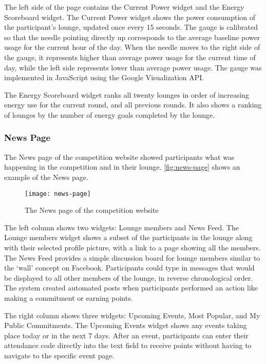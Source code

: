 The left side of the page contains the Current Power widget and the Energy Scoreboard widget. The Current Power widget shows the power consumption of the participant's lounge, updated once every 15 seconds. The gauge is calibrated so that the needle pointing directly up corresponds to the average baseline power usage for the current hour of the day. When the needle moves to the right side of the gauge, it represents higher than average power usage for the current time of day, while the left side represents lower than average power usage. The gauge was implemented in JavaScript using the Google Visualization API.\@

The Energy Scoreboard widget ranks all twenty lounges in order of increasing energy use for the current round, and all previous rounds. It also shows a ranking of lounges by the number of energy goals completed by the lounge.


\subsubsection{News Page}
\label{sec:news-page}

The News page of the competition website showed participants what was happening in the competition and in their lounge. \autoref{fig:news-page} shows an example of the News page.

\begin{figure}[htbp]
	\centering
		\texttt{[image: news-page]}
		\caption{The News page of the competition website}
\label{fig:news-page}
\end{figure}

The left column shows two widgets: Lounge members and News Feed. The Lounge members widget shows a subset of the participants in the lounge along with their selected profile picture, with a link to a page showing all the members. The News Feed provides a simple discussion board for lounge members similar to the `wall' concept on Facebook. Participants could type in messages that would be displayed to all other members of the lounge, in reverse chronological order. The system created automated posts when participants performed an action like making a commitment or earning points.

The right column shows three widgets: Upcoming Events, Most Popular, and My Public Commitments. The Upcoming Events widget shows any events taking place today or in the next 7 days. After an event, participants can enter their attendance code directly into the text field to receive points without having to navigate to the specific event page.

